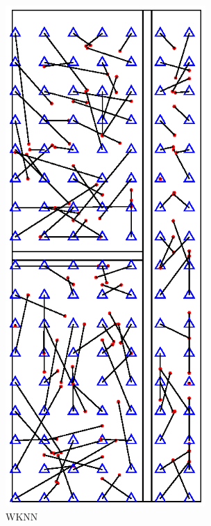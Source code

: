 \documentclass[a4paper,10pt]{article}
\begin{document}
\begin{CJK*}{UTF8}{gbsn}
\begin{figure}[h]
\begin{minipage}[t]{0.5\linewidth}
\includegraphics[width=3in]{WKNN.eps}
\caption{WKNN}
\label{WKNN}
\end{minipage}
\begin{minipage}[t]{0.5\linewidth}
\centering

\end{minipage}
\end{figure}
\end{CJK*}
\end{document}
